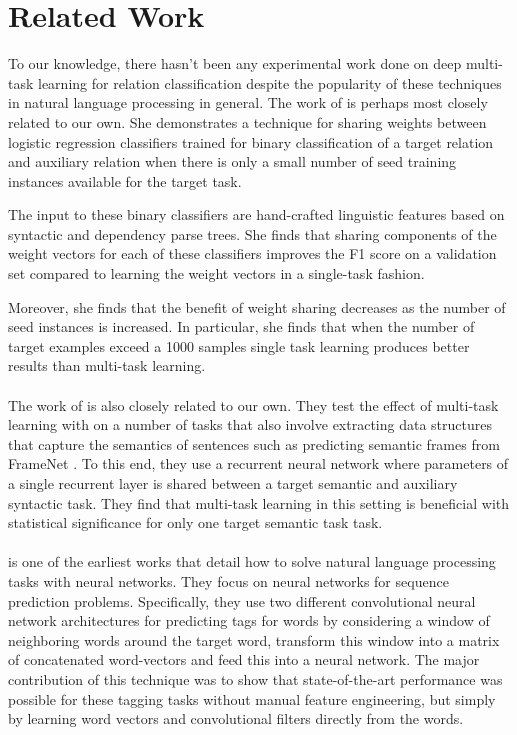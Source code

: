 \section{Related Work}
To our knowledge, there hasn't been any experimental work done on deep multi-task learning for relation classification despite the popularity of these techniques in natural language processing in general. The work of \citet{jiang2009} is perhaps most closely related to our own. She demonstrates a technique for sharing weights between logistic regression classifiers trained for binary classification of a target relation and auxiliary relation when there is only a small number of seed training instances available for the target task. 

The input to these binary classifiers are hand-crafted linguistic features based on syntactic and dependency parse trees. She finds that sharing components of the weight vectors for each of these classifiers improves the F1 score on a validation set compared to learning the weight vectors in a single-task fashion.

Moreover, she finds that the benefit of weight sharing decreases as the number of seed instances is increased. In particular, she finds that when the number of target examples exceed a 1000 samples single task learning produces better results than multi-task learning.
\\\\
The work of \citet{alonso2016} is also closely related to our own. They test the effect of multi-task learning with on a number of tasks that also involve extracting data structures that capture the semantics of sentences such as predicting semantic frames from FrameNet \cite{baker1998}. To this end, they use a recurrent neural network where parameters of a single recurrent layer is shared between a target semantic and auxiliary syntactic task. They find that multi-task learning in this setting is beneficial with statistical significance for only one target semantic task task.
\\\\
\citet{collobert2011} is one of the earliest works that detail how to solve natural language processing tasks with neural networks. They focus on neural networks for sequence prediction problems. Specifically, they use two different convolutional neural network architectures for predicting tags for words by considering a window of neighboring words around the target word, transform this window into a matrix of concatenated word-vectors and feed this into a neural network. The major contribution of this technique was to show that state-of-the-art performance was possible for these tagging tasks without manual feature engineering, but simply by learning word vectors and convolutional filters directly from the words.

